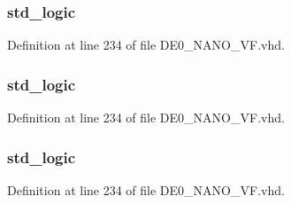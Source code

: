 \subsubsection[{dir\+P\+W\+M1}]{ {\bfseries \textcolor{comment}{std\+\_\+logic}\textcolor{vhdlchar}{ }} \hspace{0.3cm}{\ttfamily [Signal]}}\label{class_d_e0___n_a_n_o___v_f_1_1_m_a_i_n_afeb1030d6b39bba20d43f1014679dde2}


Definition at line 234 of file D\+E0\+\_\+\+N\+A\+N\+O\+\_\+\+V\+F.\+vhd.

\hypertarget{class_d_e0___n_a_n_o___v_f_1_1_m_a_i_n_a1508ba29dddf17c5b76a2f0f7ed4ce2e}{}
\subsubsection[{dir\+P\+W\+M2}]{ {\bfseries \textcolor{comment}{std\+\_\+logic}\textcolor{vhdlchar}{ }} \hspace{0.3cm}{\ttfamily [Signal]}}\label{class_d_e0___n_a_n_o___v_f_1_1_m_a_i_n_a1508ba29dddf17c5b76a2f0f7ed4ce2e}


Definition at line 234 of file D\+E0\+\_\+\+N\+A\+N\+O\+\_\+\+V\+F.\+vhd.

\hypertarget{class_d_e0___n_a_n_o___v_f_1_1_m_a_i_n_a4e57a67e14112fc504635d94387241f1}{}
\subsubsection[{dir\+P\+W\+M3}]{ {\bfseries \textcolor{comment}{std\+\_\+logic}\textcolor{vhdlchar}{ }} \hspace{0.3cm}{\ttfamily [Signal]}}\label{class_d_e0___n_a_n_o___v_f_1_1_m_a_i_n_a4e57a67e14112fc504635d94387241f1}


Definition at line 234 of file D\+E0\+\_\+\+N\+A\+N\+O\+\_\+\+V\+F.\+vhd.

